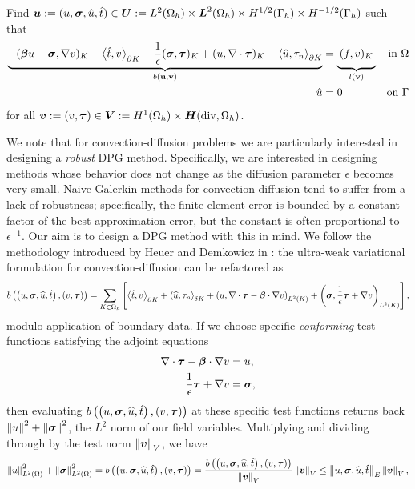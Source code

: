 \documentclass[Proposal.tex]{subfiles}
\begin{document}
Find
$\boldsymbol{u}:=(u,\boldsymbol\sigma,\hat u,\hat t)
\in\boldsymbol{U}:=L^2(\Omega_h)\times \boldsymbol{L}^2(\Omega_h)\times H^{1/2}(\Gamma_h)\times H^{-1/2}(\Gamma_h)$
such that
\begin{align}
\label{eq:variationalFormulation}
\underbrace{-(\bfbeta u-\bfsigma,\nabla v)_K+\LRa{\hat t,v}_{\partial K}
+ \frac{1}{\epsilon}(\bfsigma,\bftau)_K
+(u,\nabla\cdot\bftau)_K
-\LRa{\hat u,\tau_n}_{\partial K}}_{b(\mathbf{u}, \mathbf{v})}
&=\underbrace{\:(f,v)_K\genfrac{}{}{0pt}{}{}{}}_{l(\mathbf{v})} &\text{in }\Omega \\
\hat u&=0 &\text{on }\Gamma
\end{align}
for all $\boldsymbol{v}:=(v,\boldsymbol\tau)\in
\boldsymbol{V}:=H^1(\Omega_h)\times\mbox{\boldmath $H$}(\text{div},\Omega_h)$.


We note that for convection-diffusion problems we are particularly
interested in designing a \textit{robust} DPG method.  Specifically, we are
interested in designing methods whose behavior does not change as the
diffusion parameter $\epsilon$ becomes very small.  Naive Galerkin methods for
convection-diffusion tend to suffer from a lack of robustness; specifically,
the finite element error is bounded by a constant factor of the best
approximation error, but the constant is often proportional to
$\epsilon^{-1}$.  Our aim is to design a DPG method with this in mind.  We
follow the methodology introduced by Heuer and Demkowicz in
\cite{DemkowiczHeuer}: the ultra-weak variational formulation for
convection-diffusion can be refactored as
\[
b\left( \left( u,\boldsymbol\sigma,\widehat{u},\hat t \right),\left( v,\boldsymbol\tau \right) \right) =
\sum_{K\in \Omega_h}\left[ \left\langle \hat t,v \right\rangle_{\partial K}
+\left\langle \widehat{u},\tau_n \right\rangle_{\delta K} + \left( u,\nabla\cdot \boldsymbol\tau
-\boldsymbol\beta\cdot\nabla v \right)_{L^2(K)}
+\left( \boldsymbol\sigma,\frac{1}{\epsilon} \boldsymbol\tau + \nabla v \right)_{L^2(K)} \right],
\]
modulo application of boundary data.  If we choose specific
\textit{conforming} test functions satisfying the adjoint equations
\begin{align*}
\nabla\cdot \boldsymbol\tau - \boldsymbol\beta \cdot \nabla v &= u,\\
\frac{1}{\epsilon} \boldsymbol\tau + \nabla v &= \boldsymbol\sigma,
\end{align*}
then evaluating $b\left( \left( u,\boldsymbol\sigma,\widehat{u},\hat t \right),\left( v,\boldsymbol\tau \right) \right)$ at these
specific test functions returns back $\left\| u \right\|^2 + \left\| \boldsymbol\sigma \right\|^2$, the $L^2$
norm of our field variables.  Multiplying and dividing through by the test
norm $\left\| \boldsymbol v \right\|_V$, we have
\[
\left\| u \right\|_{L^2\left( \Omega \right)}^2 + \left\| \boldsymbol\sigma \right\|_{L^2\left( \Omega \right)}^2 =
b\left( \left( u,\boldsymbol\sigma,\widehat{u},\hat t \right),\left( v,\boldsymbol\tau \right) \right) =
\frac{b\left( \left( u,\boldsymbol\sigma,\widehat{u},\hat t \right),\left( v,\boldsymbol\tau \right) \right)}{\left\| \boldsymbol v \right\|_V}\left\| \boldsymbol v \right\|_V
\leq \left\| u,\boldsymbol\sigma,\widehat{u},\hat t \right\|_E\left\| \boldsymbol v \right\|_V,
\]
\end{document}
